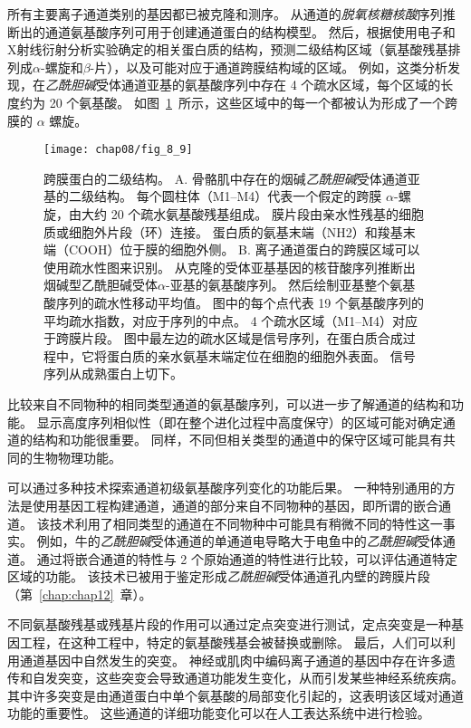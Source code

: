 所有主要离子通道类别的基因都已被克隆和测序。
从通道的\textit{脱氧核糖核酸}序列推断出的通道氨基酸序列可用于创建通道蛋白的结构模型。
然后，根据使用电子和X射线衍射分析实验确定的相关蛋白质的结构，预测二级结构区域（氨基酸残基排列成$\alpha$-螺旋和$\beta$-片），以及可能对应于通道跨膜结构域的区域。
例如，这类分析发现，在\textit{乙酰胆碱}受体通道亚基的氨基酸序列中存在 4 个疏水区域，每个区域的长度约为 20 个氨基酸。
如图~\ref{fig:8_9}~所示，这些区域中的每一个都被认为形成了一个跨膜的 $\alpha$ 螺旋。


\begin{figure}[htbp]
	\centering
	\texttt{[image: chap08/fig\_8\_9]}
	\caption{跨膜蛋白的二级结构。
		A. 骨骼肌中存在的烟碱\textit{乙酰胆碱}受体通道亚基的二级结构。
		每个圆柱体（M1–M4）代表一个假定的跨膜 $\alpha$-螺旋，由大约 20 个疏水氨基酸残基组成。
		膜片段由亲水性残基的细胞质或细胞外片段（环）连接。
		蛋白质的氨基末端（NH2）和羧基末端（COOH）位于膜的细胞外侧。
		B. 离子通道蛋白的跨膜区域可以使用疏水性图来识别。
		从克隆的受体亚基基因的核苷酸序列推断出烟碱型乙酰胆碱受体$\alpha$-亚基的氨基酸序列。
		然后绘制亚基整个氨基酸序列的疏水性移动平均值。
		图中的每个点代表 19 个氨基酸序列的平均疏水指数，对应于序列的中点。
		4 个疏水区域（M1–M4）对应于跨膜片段。
		图中最左边的疏水区域是信号序列，在蛋白质合成过程中，它将蛋白质的亲水氨基末端定位在细胞的细胞外表面。
		信号序列从成熟蛋白上切下\cite{schofield1987sequence}。}
	\label{fig:8_9}
\end{figure}


比较来自不同物种的相同类型通道的氨基酸序列，可以进一步了解通道的结构和功能。
显示高度序列相似性（即在整个进化过程中高度保守）的区域可能对确定通道的结构和功能很重要。
同样，不同但相关类型的通道中的保守区域可能具有共同的生物物理功能。


可以通过多种技术探索通道初级氨基酸序列变化的功能后果。
一种特别通用的方法是使用基因工程构建通道，通道的部分来自不同物种的基因，即所谓的嵌合通道。
该技术利用了相同类型的通道在不同物种中可能具有稍微不同的特性这一事实。
例如，牛的\textit{乙酰胆碱}受体通道的单通道电导略大于电鱼中的\textit{乙酰胆碱}受体通道。
通过将嵌合通道的特性与 2 个原始通道的特性进行比较，可以评估通道特定区域的功能。
该技术已被用于鉴定形成\textit{乙酰胆碱}受体通道孔内壁的跨膜片段（第~\ref{chap:chap12}~章）。


不同氨基酸残基或残基片段的作用可以通过定点突变进行测试，定点突变是一种基因工程，在这种工程中，特定的氨基酸残基会被替换或删除。
最后，人们可以利用通道基因中自然发生的突变。
神经或肌肉中编码离子通道的基因中存在许多遗传和自发突变，这些突变会导致通道功能发生变化，从而引发某些神经系统疾病。
其中许多突变是由通道蛋白中单个氨基酸的局部变化引起的，这表明该区域对通道功能的重要性。
这些通道的详细功能变化可以在人工表达系统中进行检验。



